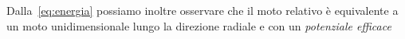 {Dalla~\eqref{eq:energia} possiamo inoltre osservare che il moto relativo è
equivalente a un moto unidimensionale lungo la direzione radiale e con un
\emph{potenziale efficace}
\begin{figure}
  \centering
\end{figure}}
